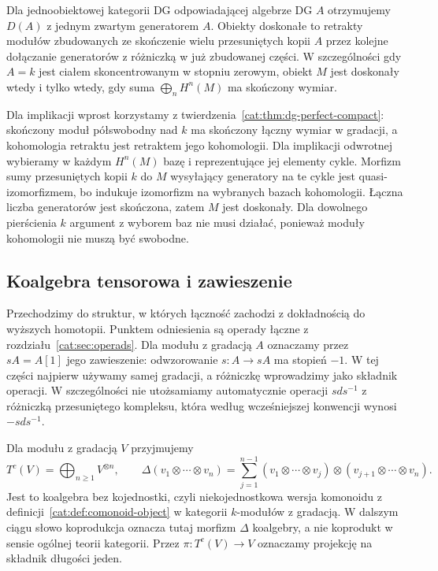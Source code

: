 \begin{przyklad}\label{cat:ex:dg-perfect-algebra}
Dla jednoobiektowej kategorii DG odpowiadającej algebrze DG $A$ otrzymujemy $D(A)$ z jednym zwartym generatorem $A$. Obiekty doskonałe to retrakty modułów zbudowanych ze skończenie wielu przesuniętych kopii $A$ przez kolejne dołączanie generatorów z różniczką w już zbudowanej części. W szczególności gdy $A=k$ jest ciałem skoncentrowanym w stopniu zerowym, obiekt $M$ jest doskonały wtedy i tylko wtedy, gdy suma $\bigoplus_n H^n(M)$ ma skończony wymiar.

Dla implikacji wprost korzystamy z twierdzenia~\ref{cat:thm:dg-perfect-compact}: skończony moduł półswobodny nad $k$ ma skończony łączny wymiar w gradacji, a kohomologia retraktu jest retraktem jego kohomologii. Dla implikacji odwrotnej wybieramy w każdym $H^n(M)$ bazę i reprezentujące jej elementy cykle. Morfizm sumy przesuniętych kopii $k$ do $M$ wysyłający generatory na te cykle jest quasi-izomorfizmem, bo indukuje izomorfizm na wybranych bazach kohomologii. Łączna liczba generatorów jest skończona, zatem $M$ jest doskonały. Dla dowolnego pierścienia $k$ argument z wyborem baz nie musi działać, ponieważ moduły kohomologii nie muszą być swobodne.
\end{przyklad}

\subsection{Koalgebra tensorowa i zawieszenie}

Przechodzimy do struktur, w których łączność zachodzi z dokładnością do wyższych homotopii. Punktem odniesienia są operady łączne z rozdziału~\ref{cat:sec:operads}. Dla modułu z gradacją $A$ oznaczamy przez $sA=A[1]$ jego zawieszenie: odwzorowanie $s:A\to sA$ ma stopień $-1$. W tej części najpierw używamy samej gradacji, a różniczkę wprowadzimy jako składnik operacji. W szczególności nie utożsamiamy automatycznie operacji $sds^{-1}$ z różniczką przesuniętego kompleksu, która według wcześniejszej konwencji wynosi $-sds^{-1}$.

\begin{definicja}\label{cat:def:ainfty-tensor-coalgebra}
Dla modułu z gradacją $V$ przyjmujemy
\[
 T^c(V)=\bigoplus_{n\geq1} V^{\otimes n},\qquad
 \Delta(v_1\otimes\cdots\otimes v_n)
 =\sum_{j=1}^{n-1}
 (v_1\otimes\cdots\otimes v_j)\otimes
 (v_{j+1}\otimes\cdots\otimes v_n).
\]
Jest to koalgebra bez kojednostki, czyli niekojednostkowa wersja komonoidu z definicji~\ref{cat:def:comonoid-object} w kategorii $k$-modułów z gradacją. W dalszym ciągu słowo koprodukcja oznacza tutaj morfizm $\Delta$ koalgebry, a nie koprodukt w sensie ogólnej teorii kategorii. Przez $\pi:T^c(V)\to V$ oznaczamy projekcję na składnik długości jeden.
\end{definicja}

